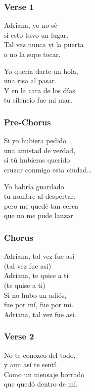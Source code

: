 \subsubsection{Verse 1}\label{verse-1-16}

Adriana, yo no sé\\
si esto tuvo un lugar.\\
Tal vez nunca vi la puerta\\
o no la supe tocar.

Yo quería darte un hola,\\
una risa al pasar.\\
Y en la cara de los días\\
tu silencio fue mi mar.

\subsubsection{Pre-Chorus}\label{pre-chorus-23}

Si yo hubiera pedido\\
una amistad de verdad,\\
si tú hubieras querido\\
cruzar conmigo esta ciudad\ldots{}

Yo habría guardado\\
tu nombre al despertar,\\
pero me quedé tan cerca\\
que no me pude lanzar.

\subsubsection{Chorus}\label{chorus-42}

Adriana, tal vez fue así\\
(tal vez fue así)\\
Adriana, te quise a ti\\
(te quise a ti)\\
Si no hubo un adiós,\\
fue por mí, fue por mí.\\
Adriana, tal vez fue así.

\subsubsection{Verse 2}\label{verse-2-16}

No te conozco del todo,\\
y aun así te sentí.\\
Como un mensaje borrado\\
que quedó dentro de mí.

